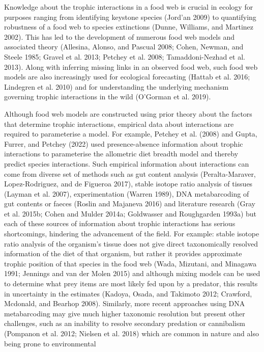 \documentclass{article}
\begin{document}
Knowledge about the trophic interactions in a food web is crucial in
ecology for purposes ranging from identifying keystone species (Jord'an
2009) to quantifying robustness of a food web to species extinctions
(Dunne, Williams, and Martinez 2002). This has led to the development of
numerous food web models and associated theory (Allesina, Alonso, and
Pascual 2008; Cohen, Newman, and Steele 1985; Gravel et al. 2013;
Petchey et al. 2008; Tamaddoni-Nezhad et al. 2013). Along with inferring
missing links in an observed food web, such food web models are also
increasingly used for ecological forecasting (Hattab et al. 2016;
Lindegren et al. 2010) and for understanding the underlying mechanism
governing trophic interactions in the wild (O'Gorman et al. 2019).

Although food web models are constructed using prior theory about the
factors that determine trophic interactions, empirical data about
interactions are required to parameterise a model. For example, Petchey
et al. (2008) and Gupta, Furrer, and Petchey (2022) used
presence-absence information about trophic interactions to parameterise
the allometric diet breadth model and thereby predict species
interactions. Such empirical information about interactions can come
from diverse set of methods such as gut content analysis
(Peralta-Maraver, Lopez-Rodriguez, and de Figueroa 2017), stable isotope
ratio analysis of tissues (Layman et al. 2007), experimentation (Warren
1989), DNA metabarcoding of gut contents or faeces (Roslin and Majaneva
2016) and literature research (Gray et al. 2015b; Cohen and Mulder
2014a; Goldwasser and Roughgarden 1993a) but each of these sources of
information about trophic interactions has serious shortcomings,
hindering the advancement of the field. For example: stable isotope
ratio analysis of the organism's tissue does not give direct
taxonomically resolved information of the diet of that organism, but
rather it provides approximate trophic position of that species in the
food web (Wada, Mizutani, and Minagawa 1991; Jennings and van der Molen
2015) and although mixing models can be used to determine what prey
items are most likely fed upon by a predator, this results in
uncertainty in the estimates (Kadoya, Osada, and Takimoto 2012;
Crawford, Mcdonald, and Bearhop 2008). Similarly, more recent approaches
using DNA metabarcoding may give much higher taxonomic resolution but
present other challenges, such as an inability to resolve secondary
predation or cannibalism (Pompanon et al. 2012; Nielsen et al. 2018)
which are common in nature and also being prone to environmental
\end{document}
